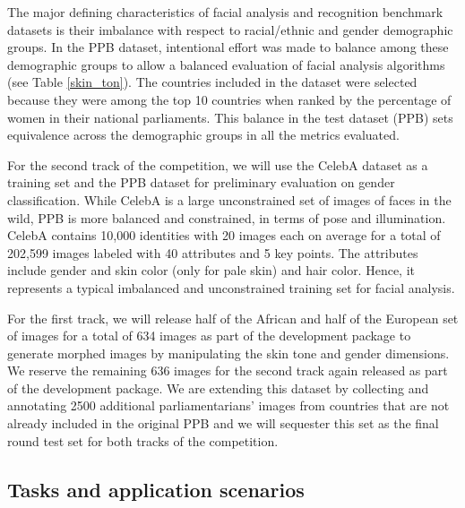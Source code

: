 \documentclass[11pt, oneside]{article}
\makeatletter
\let\@internalcite\cite
\def\cite{\def\citeauthoryear##1##2{##1, ##2}\@internalcite}
\makeatother
\begin{document}


The major defining characteristics of facial analysis and recognition benchmark 
datasets is their imbalance with respect to racial/ethnic and gender 
demographic groups. In the PPB  dataset, intentional effort was made to balance 
among these demographic groups to allow a balanced evaluation of facial 
analysis algorithms (see Table \ref{skin_ton}). The countries included in the 
dataset were selected because they were among the top 10 countries when ranked 
by the percentage of women in their national parliaments. This balance in the 
test dataset (PPB) sets equivalence across the demographic groups in all the 
metrics evaluated.



For the second track of the competition, we will use the CelebA dataset 
\cite{liu2015deep} as a training set and the PPB dataset for preliminary 
evaluation on gender classification. While CelebA is a large unconstrained 
set of images of faces in the wild, PPB is more balanced and constrained, in terms 
of pose and illumination. CelebA contains 10,000 
identities with 20 images each on average for a total of 202,599 images labeled 
with 40 attributes and 5 key points. The attributes include gender and skin 
color (only for pale skin) and hair color. Hence, it represents a typical 
imbalanced and unconstrained training set for facial analysis.

For the first track, we will release half of the African and half of the 
European set of images for a total of 634 images as part of the development 
package to generate morphed images by manipulating the skin tone and gender 
dimensions. We reserve the remaining 636 images for the second track again 
released as part of the development package. We are extending this dataset by 
collecting and annotating 2500 additional parliamentarians' images from 
countries that are not already included in the original PPB and we will 
sequester this set as the final round test set for both tracks of the 
competition.

\subsection{Tasks and application scenarios}

\end{document}
